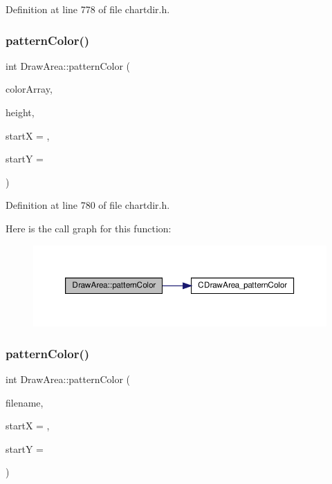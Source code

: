 Definition at line 778 of file chartdir.\+h.

\mbox{\label{class_draw_area_a0defba413a9383ceb37279ba60b6500b}} 
\subsubsection{\texorpdfstring{pattern\+Color()}{patternColor()}\hspace{0.1cm}{\footnotesize\ttfamily [2/3]}}
{\footnotesize\ttfamily int Draw\+Area\+::pattern\+Color (\begin{DoxyParamCaption}\item[{\hyperlink{class_int_array}{Int\+Array}}]{color\+Array,  }\item[{int}]{height,  }\item[{int}]{startX = {},  }\item[{int}]{startY = {} }\end{DoxyParamCaption})\hspace{0.3cm}{\ttfamily [inline]}}



Definition at line 780 of file chartdir.\+h.

Here is the call graph for this function\+:
\nopagebreak
\begin{figure}[H]
\begin{center}
\leavevmode
\includegraphics[width=350pt]{class_draw_area_a0defba413a9383ceb37279ba60b6500b_cgraph}
\end{center}
\end{figure}
\mbox{\label{class_draw_area_a353e36c907dc26831773d2fdf2456745}} 
\subsubsection{\texorpdfstring{pattern\+Color()}{patternColor()}\hspace{0.1cm}{\footnotesize\ttfamily [3/3]}}
{\footnotesize\ttfamily int Draw\+Area\+::pattern\+Color (\begin{DoxyParamCaption}\item[{const char $\ast$}]{filename,  }\item[{int}]{startX = {},  }\item[{int}]{startY = {} }\end{DoxyParamCaption})\hspace{0.3cm}{\ttfamily [inline]}}



